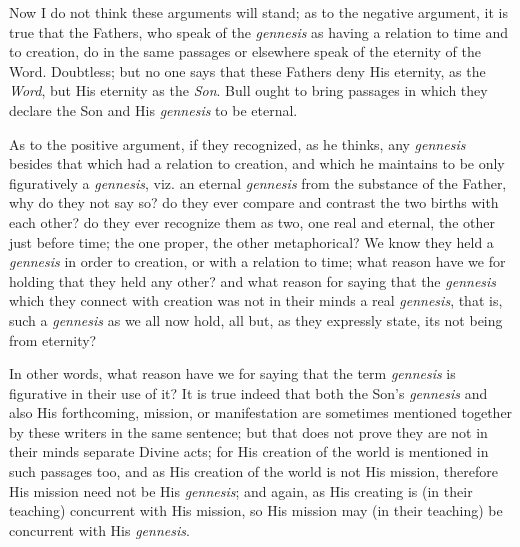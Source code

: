 Now I do not think these arguments will stand; as to the negative
argument, it is true that the Fathers, who speak of the \emph{gennesis}
as having a relation to time and to creation, do in the same passages
or elsewhere speak of the eternity of the Word. Doubtless; but no one
says that these Fathers deny His eternity, as the \emph{Word}, but His
eternity as the \emph{Son}. Bull ought to bring passages in which they
declare the Son and His \emph{gennesis} to be eternal.

As to the positive argument, if they recognized, as he thinks,
any \emph{gennesis} besides that which had a relation to
creation, and which he maintains to be only figuratively a \emph{gennesis},
viz. an eternal \emph{gennesis} from the substance of the Father, why
do they not say so? do they ever compare and contrast the two births
with each other? do they ever recognize them as two, one real and
eternal, the other just before time; the one proper, the other
metaphorical? We know they held a \emph{gennesis} in order to
creation, or with a relation to time; what reason have we for holding
that they held any other? and what reason for saying that the \emph{gennesis}
which they connect with creation was not in their minds a real \emph{gennesis},
that is, such a \emph{gennesis} as we all now hold, all but, as they
expressly state, its not being from eternity?

In other words, what reason have we for saying that the term \emph{gennesis}
is figurative in their use of it? It is true indeed that both the Son's
\emph{gennesis} and also His forthcoming, mission, or manifestation
are sometimes mentioned together by these writers in the same
sentence; but that does not prove they are not in their minds separate
Divine acts; for His creation of the world is mentioned in such
passages too, and as His creation of the world is not His mission,
therefore His mission need not be His \emph{gennesis}; and again, as
His creating is (in their teaching) concurrent with His mission, so
His mission may (in their teaching) be concurrent with His \emph{gennesis}.

